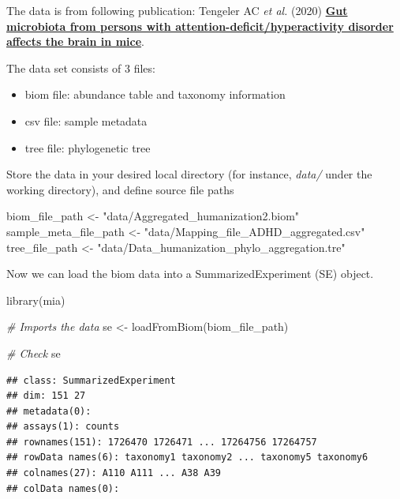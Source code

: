 \documentclass[
]{book}
\newenvironment{Shaded}{\begin{snugshade}}{\end{snugshade}}
\newcommand{\CommentTok}[1]{\textcolor[rgb]{0.56,0.35,0.01}{\textit{#1}}}
\newcommand{\FunctionTok}[1]{\textcolor[rgb]{0.00,0.00,0.00}{#1}}
\newcommand{\NormalTok}[1]{#1}
\newcommand{\OtherTok}[1]{\textcolor[rgb]{0.56,0.35,0.01}{#1}}
\newcommand{\StringTok}[1]{\textcolor[rgb]{0.31,0.60,0.02}{#1}}
\providecommand{\tightlist}{%
  \setlength{\itemsep}{0pt}\setlength{\parskip}{0pt}}
\begin{document}
The data is from following publication:
Tengeler AC \emph{et al.} (2020) \href{https://doi.org/10.1186/s40168-020-00816-x}{\textbf{Gut microbiota from persons with
attention-deficit/hyperactivity disorder affects the brain in
mice}}.

The data set consists of 3 files:

\begin{itemize}
\tightlist
\item
  biom file: abundance table and taxonomy information
\item
  csv file: sample metadata
\item
  tree file: phylogenetic tree
\end{itemize}

Store the data in your desired local directory (for instance, \emph{data/} under the
working directory), and define source file paths

\begin{Shaded}
\begin{Highlighting}[]
\NormalTok{biom\_file\_path }\OtherTok{\textless{}{-}} \StringTok{"data/Aggregated\_humanization2.biom"}
\NormalTok{sample\_meta\_file\_path }\OtherTok{\textless{}{-}} \StringTok{"data/Mapping\_file\_ADHD\_aggregated.csv"}
\NormalTok{tree\_file\_path }\OtherTok{\textless{}{-}} \StringTok{"data/Data\_humanization\_phylo\_aggregation.tre"}
\end{Highlighting}
\end{Shaded}

Now we can load the biom data into a SummarizedExperiment (SE) object.

\begin{Shaded}
\begin{Highlighting}[]
\FunctionTok{library}\NormalTok{(mia)}

\CommentTok{\# Imports the data}
\NormalTok{se }\OtherTok{\textless{}{-}} \FunctionTok{loadFromBiom}\NormalTok{(biom\_file\_path)}

\CommentTok{\# Check}
\NormalTok{se}
\end{Highlighting}
\end{Shaded}

\begin{verbatim}
## class: SummarizedExperiment 
## dim: 151 27 
## metadata(0):
## assays(1): counts
## rownames(151): 1726470 1726471 ... 17264756 17264757
## rowData names(6): taxonomy1 taxonomy2 ... taxonomy5 taxonomy6
## colnames(27): A110 A111 ... A38 A39
## colData names(0):
\end{verbatim}
\end{document}
